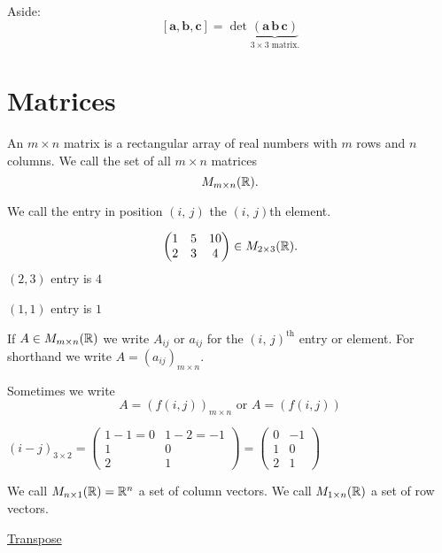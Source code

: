 \documentclass[10pt, a4paper]{article}
\newcommand{\mbf}[1]{\mathbf{#1}}
\begin{document}
Aside:
\[
[\mbf{a}, \mbf{b}, \mbf{c}] = \det\underbrace{\left(\mbf{a}\, \mbf{b}\, \mbf{c}\right)}_{3 \times 3 \text{ matrix}.}
\]

\newpage

\section{Matrices}

\begin{definition}
    An $m \times n$ matrix is a rectangular array of real numbers with $m$ rows and $n$ columns. We call the set of all $m \times n$ matrices
    \[
    M_{m \times n}(\mathbb{R}).
    \]
\end{definition}

We call the entry in position $(i,\,j)$ the $(i,\,j)$th element.

\begin{example}
    \[
    \begin{pmatrix}
        1 & 5 & 10 \\
        2 & 3 & 4
    \end{pmatrix} \in M_{2 \times 3}(\mathbb{R}).
    \]
    $(2, 3)$ entry is $4$

    $(1, 1)$ entry is $1$
\end{example}

If $A \in M_{m \times n}(\mathbb{R})$ we write $A_{ij}$ or $a_{ij}$ for the $(i,\,j)^{\text{th}}$ entry or element. For shorthand we write $A = (a_{ij})_{m \times n}$.

Sometimes we write
\[
A = (f(i, j))_{m \times n} \text{ or } A = (f(i, j))
\]

\begin{example}
    $(i - j)_{3 \times 2} = \begin{pmatrix}
        1 - 1 = 0 & 1 - 2 = -1 \\
        1 & 0 \\
        2 & 1
    \end{pmatrix}
    =
    \begin{pmatrix}
        0 & -1 \\
        1 & 0 \\
        2 & 1
    \end{pmatrix}$
\end{example}

We call $M_{n \times 1}(\mathbb{R}) = \mathbb{R} ^ n$ a set of column vectors. We call $M_{1 \times n}(\mathbb{R})$ a set of row vectors.

\underline{Transpose}
\end{document}

